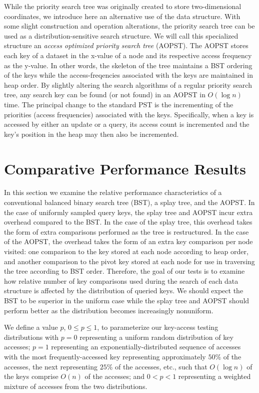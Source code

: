 \documentclass{article}
\begin{document}
While the priority search tree was originally created to store two-dimensional coordinates, we introduce here an alternative use of the data structure. With some slight construction and operation alterations, the priority search tree can be used as a distribution-sensitive search structure. We will call this specialized structure an {\em access optimized priority search tree} (AOPST). The AOPST stores each key of a dataset in the x-value of a node and its respective access frequency as the y-value. In other words, the skeleton of the tree maintains a BST ordering of the keys while the access-freqencies associated with the keys are maintained in heap order. By slightly altering the search algorithms of a regular priority search tree, any search key can be found (or not found) in an AOPST in $O(\log n)$ time. The principal change to the standard PST is the incrementing of the priorities (access frequencies) associated with the keys. Specifically, when a key is accessed by either an update or a query, its access count is incremented and the key's position in the heap may then also be incremented.

\section{Comparative Performance Results}

In this section we examine the relative performance characteristics of a conventional balanced binary search tree (BST), a splay tree, and the AOPST. In the case of uniformly sampled query keys, the splay tree and AOPST incur extra overhead compared to the BST. In the case of the splay tree, this overhead takes the form of extra comparisons performed as the tree is restructured. In the case of the AOPST, the overhead takes the form of an extra key comparison per node visited: one comparison to the key stored at each node according to heap order, and another comparison to the pivot key stored at each node for use in traversing the tree according to BST order. Therefore, the goal of our tests is to examine how relative number of key comparisons used during the search of each data structure is affected by the distribution of queried keys. We should expect the BST to be superior in the uniform case while the splay tree and AOPST should perform better as the distribution becomes increasingly nonuniform. 

We define a value $p$, $0\leq p\leq 1$, to parameterize our key-access testing distributions with $p=0$ representing a uniform random distribution of key accesses; $p=1$ representing an exponentially-distributed sequence of accesses with the most frequently-accessed key representing approximately $50\%$ of the accesses, the next representing $25\%$ of the accesses, etc., such that $O(\log n)$ of the keys comprise $O(n)$ of the accesses; and $0<p<1$ representing a weighted mixture of accesses from the two distributions. 
	
\end{document}
